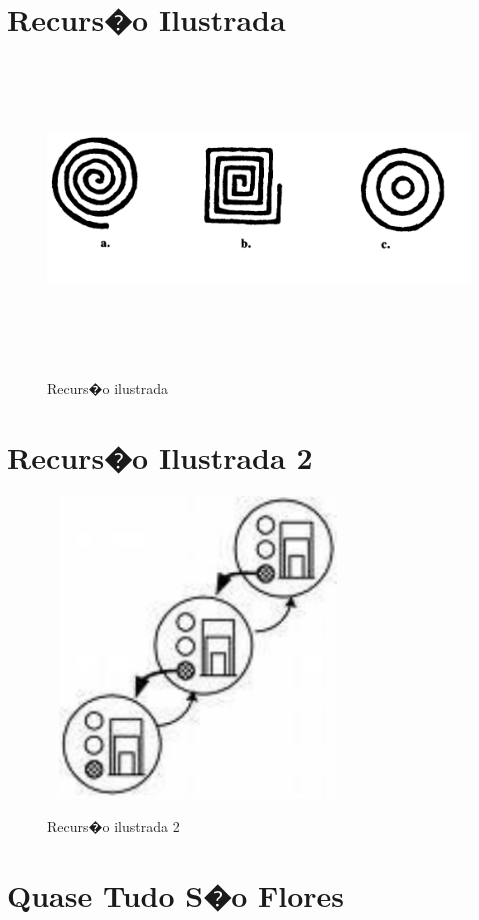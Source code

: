 \documentclass[final,a4paper]{article}
\begin{document}
\section{Recurs�o Ilustrada}


\begin{figure}[!htb]
\centering
\includegraphics[height=8cm, width=12cm]{figuras/recursividade_ilustra_1.pdf}
\label{fig_recurs_1}
\caption{Recurs�o ilustrada}
\end{figure}


\section{Recurs�o Ilustrada 2}


\begin{figure}[!htb]
\centering
\includegraphics[height=8cm, width=8cm]{figuras/recursividade_ilustra_2.pdf}
\label{fig_recurs_3}
\caption{Recurs�o ilustrada 2}
\end{figure}


\section{Quase Tudo S�o Flores}
\end{document}
